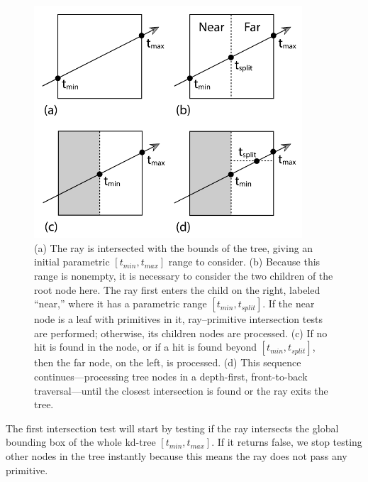 \documentclass[11pt,a4paper]{article}
\begin{document}
\begin{figure}[H]	
     \centering
     \captionsetup{justification=centering,margin=2cm}
     \includegraphics[width=10cm]{images/kdtree/traversal.png}
     \caption{(a) The ray is intersected with the bounds of the tree, giving an initial parametric $[t_{min}, t_{max}]$ range to consider. (b) Because this range is nonempty, it is necessary to consider the two children of the root node here. The ray first enters the child on the right, labeled “near,” where it has a parametric range $[t_{min}, t_{split}]$. If the near node is a leaf with primitives in it, ray–primitive intersection tests are performed; otherwise, its children nodes are processed. (c) If no hit is found in the node, or if a hit is found beyond $[t_{min}, t_{split}]$, then the far node, on the left, is processed. (d) This sequence continues—processing tree nodes in a depth-first, front-to-back traversal—until the closest intersection is found or the ray exits the tree. \protect\cite{Pharr2016}}
        \label{fig:dice}
\end{figure}


The first intersection test will start by testing if the ray intersects the global bounding box of the whole kd-tree $[t_{min}, t_{max}]$. If it returns false, we stop testing other nodes in the tree instantly because this means the ray does not pass any primitive.
\\
\noindent
\end{document}
